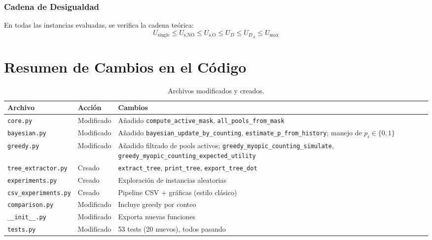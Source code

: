 \documentclass[11pt, a4paper]{article}
\begin{document}
\subsubsection{Cadena de Desigualdad}
En todas las instancias evaluadas, se verifica la cadena te\'orica:
\begin{equation}
    U_{\text{single}} \leq U_{\text{s,NO}} \leq U_{\text{s,O}}
    \leq U_D \leq U_{D_A} \leq U_{\max}
\end{equation}

\section{Resumen de Cambios en el C\'odigo}

\begin{table}[htbp]
\centering
\caption{Archivos modificados y creados.}
\begin{tabular}{llp{7cm}}
\toprule
\textbf{Archivo} & \textbf{Acci\'on} & \textbf{Cambios} \\
\midrule
\texttt{core.py} & Modificado & A\~nadido \texttt{compute\_active\_mask},
\texttt{all\_pools\_from\_mask} \\
\texttt{bayesian.py} & Modificado & A\~nadido \texttt{bayesian\_update\_by\_counting},
\texttt{estimate\_p\_from\_history}; manejo de $p_i \in \{0,1\}$ \\
\texttt{greedy.py} & Modificado & A\~nadido filtrado de pools activos;
\texttt{greedy\_myopic\_counting\_simulate},
\texttt{greedy\_myopic\_counting\_expected\_utility} \\
\texttt{tree\_extractor.py} & Creado & \texttt{extract\_tree}, \texttt{print\_tree},
\texttt{export\_tree\_dot} \\
\texttt{experiments.py} & Creado & Exploraci\'on de instancias aleatorias \\
\texttt{csv\_experiments.py} & Creado & Pipeline CSV + gr\'aficas (estilo cl\'asico) \\
\texttt{comparison.py} & Modificado & Incluye greedy por conteo \\
\texttt{\_\_init\_\_.py} & Modificado & Exporta nuevas funciones \\
\texttt{tests.py} & Modificado & 53 tests (20 nuevos), todos pasando \\
\bottomrule
\end{tabular}
\end{table}

\end{document}
